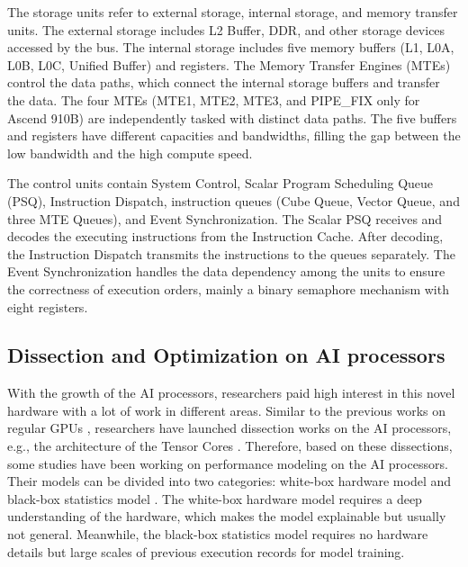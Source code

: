 \documentclass[12pt]{extbook}
\begin{document}
The storage units refer to external storage, internal storage, and memory transfer units. The external storage includes L2 Buffer, DDR, and other storage devices accessed by the bus. The internal storage includes five memory buffers (L1, L0A, L0B, L0C, Unified Buffer) and registers. The Memory Transfer Engines (MTEs) control the data paths, which connect the internal storage buffers and transfer the data. The four MTEs (MTE1, MTE2, MTE3, and PIPE\_FIX only for Ascend 910B) are independently tasked with distinct data paths. The five buffers and registers have different capacities and bandwidths, filling the gap between the low bandwidth and the high compute speed. 
        
The control units contain System Control, Scalar Program Scheduling Queue (PSQ), Instruction Dispatch, instruction queues (Cube Queue, Vector Queue, and three MTE Queues), and Event Synchronization. The Scalar PSQ receives and decodes the executing instructions from the Instruction Cache. After decoding, the Instruction Dispatch transmits the instructions to the queues separately. The Event Synchronization handles the data dependency among the units to ensure the correctness of execution orders, mainly a binary semaphore mechanism with eight registers. 

\subsection{Dissection and Optimization on AI processors}
\label{Sec:1_1_3}

With the growth of the AI processors, researchers paid high interest in this novel hardware with a lot of work in different areas. Similar to the previous works on regular GPUs \cite{DBLP:conf/ppopp/ZhangTXLZC17}, researchers have launched dissection works on the AI processors, e.g., the architecture of the Tensor Cores \cite{DBLP:journals/corr/abs-1804-06826}. Therefore, based on these dissections, some studies have been working on performance modeling on the AI processors. Their models can be divided into two categories: white-box hardware model \cite{DBLP:conf/ispass/RaihanGA19} and black-box statistics model \cite{DBLP:conf/nips/ChenZYJMCGK18, DBLP:journals/corr/abs-2008-01040}. The white-box hardware model requires a deep understanding of the hardware, which makes the model explainable but usually not general. Meanwhile, the black-box statistics model requires no hardware details but large scales of previous execution records for model training. 
\end{document}
